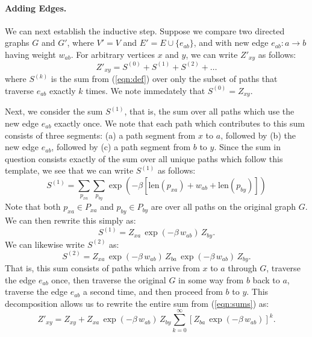 \paragraph{Adding Edges.}
We can next establish the inductive step.
Suppose we compare two directed graphs $G$ and $G'$,
where $V' = V$ and $E' = E \cup \{ e_{ab} \}$,
and with new edge $e_{ab} : a \rightarrow b$ having weight $w_{ab}$.
For arbitrary vertices $x$ and $y$, we can write $Z'_{xy}$ as follows:
\begin{equation}
   Z'_{xy} = S^{(0)} + S^{(1)} + S^{(2)} + \dots
   \label{eqn:sums}
\end{equation}
where $S^{(k)}$ is the sum from (\ref{eqn:def})
over only the subset of paths that traverse $e_{ab}$ exactly $k$ times.
We note immedately that $S^{(0)} = Z_{xy}$.

Next, we consider the sum $S^{(1)}$,
that is, the sum over all paths which use the new edge $e_{ab}$
exactly once.
We note that each path which contributes to this sum consists of
three segments:
(a) a path segment from $x$ to $a$,
followed by (b) the new edge $e_{ab}$,
followed by (c) a path segment from $b$ to $y$.
Since the sum in question consists exactly of the sum over all unique
paths which follow this template,
we see that we can write $S^{(1)}$ as follows:
\begin{equation}
   S^{(1)} = \sum_{p_{xa}} \sum_{p_{by}}
      \exp\left(
         - \beta \left[ \mbox{len}(p_{xa}) + w_{ab} + \mbox{len}(p_{by}) \right]
         \right)
\end{equation}
Note that both $p_{xa} \in P_{xa}$ and $p_{by} \in P_{by}$
are over all paths on the original graph $G$.
We can then rewrite this simply as:
\begin{equation}
   S^{(1)} = Z_{xa} \, \exp(-\beta \, w_{ab}) \, Z_{by}.
\end{equation}
We can likewise write $S^{(2)}$ as:
\begin{equation}
   S^{(2)} = Z_{xa} \, \exp(-\beta \, w_{ab}) \, Z_{ba} \, \exp(-\beta \,  w_{ab}) \, Z_{by}.
\end{equation}
That is,
this sum consists of paths which arrive from $x$ to $a$ through $G$,
traverse the edge $e_{ab}$ once,
then traverse the original $G$ in some way from $b$ back to $a$,
traverse the edge $e_{ab}$ a second time,
and then proceed from $b$ to $y$.
This decomposition allows us to rewrite
the entire sum from (\ref{eqn:sums}) as:
\begin{equation}
   Z'_{xy} = Z_{xy} + Z_{xa} \, \exp(-\beta \, w_{ab}) \, Z_{by}
      \sum_{k=0}^{\infty} \left[ Z_{ba} \, \exp(-\beta \, w_{ab}) \right]^k. 
\end{equation}

